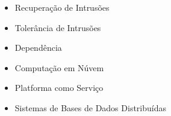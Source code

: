 \begin{resumo}

\end{resumo}
\vspace{-2cm}
\begin{palavraschave}
\vspace{-1cm}
\begin{itemize}
\item Recuperação de Intrusões
\item Tolerância de Intrusões
\item Dependência
\item Computação em Núvem
\item Platforma como Serviço
\item Sistemas de Bases de Dados Distribuídas
\end{itemize}
\end{palavraschave}
\clearpage
\thispagestyle{empty}
\cleardoublepage
